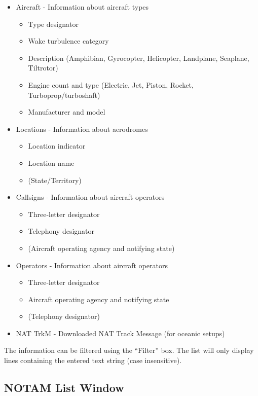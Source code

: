 \documentclass[a4paper,oneside,11pt]{memoir}
\begin{document}
\begin{itemize}
    \item Aircraft - Information about aircraft types
    \begin{itemize}
        \item Type designator
        \item Wake turbulence category
        \item Description (Amphibian, Gyrocopter, Helicopter, Landplane, Seaplane, Tiltrotor)
        \item Engine count and type (Electric, Jet, Piston, Rocket, Turboprop/turboshaft)
        \item Manufacturer and model
    \end{itemize}
    \item Locations - Information about aerodromes
    \begin{itemize}
        \item Location indicator
        \item Location name
        \item (State/Territory)
    \end{itemize}
    \item Callsigns - Information about aircraft operators
    \begin{itemize}
        \item Three-letter designator
        \item Telephony designator
        \item (Aircraft operating agency and notifying state)
    \end{itemize}   
    \item Operators - Information about aircraft operators
    \begin{itemize}
        \item Three-letter designator
        \item Aircraft operating agency and notifying state
        \item (Telephony designator)
    \end{itemize}
    \item NAT TrkM - Downloaded NAT Track Message (for oceanic setups)
\end{itemize}

\bigskip

The information can be filtered using the “Filter” box. The list will only display lines containing the entered text string (case insensitive).

\subsection{NOTAM List Window}
\label{win:notamlw}
\end{document}
